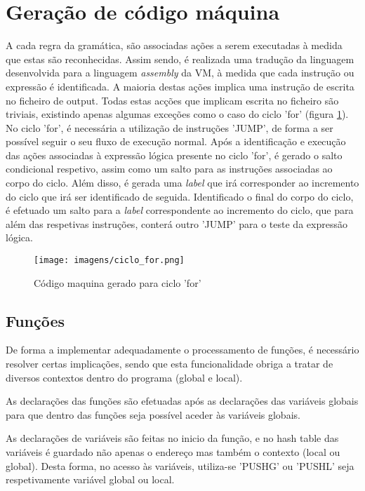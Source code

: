 \documentclass[a4paper,10pt]{report}
\begin{document}
\section{Geração de código máquina}
A cada regra da gramática, são associadas ações a serem executadas à medida que estas são reconhecidas. Assim sendo, é realizada uma tradução da linguagem desenvolvida para a linguagem \emph{assembly} da VM, à medida que cada instrução ou expressão é identificada. A maioria destas ações implica uma instrução de escrita no ficheiro de output. Todas estas acções que implicam escrita no ficheiro são triviais, existindo apenas algumas exceções como o caso do ciclo 'for' (figura \ref{fig:for}).
No ciclo 'for', é necessária a utilização de instruções 'JUMP', de forma a ser possível seguir o seu fluxo de execução normal. Após a identificação e execução das ações associadas à expressão lógica presente no ciclo 'for', é gerado o salto condicional respetivo, assim como um salto para as instruções associadas ao corpo do ciclo. Além disso, é gerada uma \emph{label} que irá corresponder ao incremento do ciclo que irá ser identificado de seguida. Identificado o final do corpo do ciclo, é efetuado um salto para a \emph{label} correspondente ao incremento do ciclo, que para além das respetivas instruções, conterá outro 'JUMP' para o teste da expressão lógica.

\begin{figure}
\centering
\texttt{[image: imagens/ciclo\_for.png]}
\caption{Código maquina gerado para ciclo 'for'}
\label{fig:for}
\end{figure}




\subsection{Funções}

De forma a implementar adequadamente o processamento de funções, é necessário resolver certas implicações, sendo que esta funcionalidade obriga a tratar de diversos contextos dentro do programa (global e local).

As declarações das funções são efetuadas após as declarações das variáveis globais para que dentro das funções seja possível aceder às variáveis globais.

As declarações de variáveis são feitas no inicio da função, e no hash table das variáveis é guardado não apenas o endereço mas também o contexto (local ou global). Desta forma, no acesso às variáveis, utiliza-se 'PUSHG' ou 'PUSHL' seja respetivamente variável global ou local.
\end{document}
